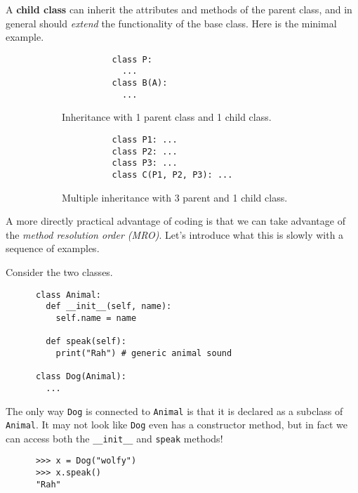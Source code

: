   \begin{definition}
    A \textbf{child class} can inherit the attributes and methods of the parent class, and in general should \textit{extend} the functionality of the base class. Here is the minimal example. 

    \begin{figure}[H]
      \centering
      \begin{subfigure}[b]{0.48\textwidth}
        \centering
        \begin{lstlisting}
          class P: 
            ... 
          class B(A): 
            ...
        \end{lstlisting}
        \caption{Inheritance with 1 parent class and 1 child class.}
      \end{subfigure}
      \hfill 
      \begin{subfigure}[b]{0.48\textwidth}
        \centering
        \begin{lstlisting}
          class P1: ... 
          class P2: ...
          class P3: ... 
          class C(P1, P2, P3): ...
        \end{lstlisting}
        \caption{Multiple inheritance with 3 parent and 1 child class.}
      \end{subfigure}
      \caption{}
    \end{figure}
  \end{definition}


  A more directly practical advantage of coding is that we can take advantage of the \textit{method resolution order (MRO)}. Let's introduce what this is slowly with a sequence of examples. 

  \begin{example}
    Consider the two classes. 
    \begin{lstlisting}
      class Animal: 
        def __init__(self, name): 
          self.name = name 

        def speak(self): 
          print("Rah") # generic animal sound

      class Dog(Animal): 
        ...
    \end{lstlisting} 
    The only way \texttt{Dog} is connected to \texttt{Animal} is that it is declared as a subclass of \texttt{Animal}. It may not look like \texttt{Dog} even has a constructor method, but in fact we can access both the \texttt{\_\_init\_\_} and \texttt{speak} methods! 
    \begin{lstlisting} 
      >>> x = Dog("wolfy") 
      >>> x.speak() 
      "Rah"
    \end{lstlisting}
  \end{example} 

